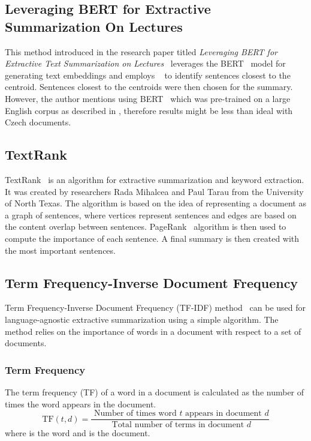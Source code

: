 \documentclass[english, ba, kiv, he, iso690numb, pdf, viewonly]{fasthesis}
\begin{document}
\subsection{Leveraging BERT for Extractive Summarization On Lectures} \label{bertlecturesummary}
This method introduced in the research paper titled \textit{Leveraging BERT for Extractive Text Summarization on
Lectures}~\cite{miller2019leveraging} leverages the BERT~\cite{devlin2019bert} model for generating text embeddings and employs ~\cite{Jin2010} to identify sentences closest to the centroid. Sentences closest to the centroids were then chosen for the summary. However, the author mentions using BERT~\cite{devlin2019bert} which was pre-trained on a large English corpus as described in \cite{devlin2019bert}, therefore results might be less than ideal with Czech documents.

\subsection{TextRank}\label{textrank}
TextRank~\cite{mihalcea-tarau-2004-textrank} is an algorithm for extractive summarization and keyword extraction. It was created by researchers Rada Mihalcea and Paul Tarau from the University of North Texas. The algorithm is based on the idea of representing a document as a graph of sentences, where vertices represent sentences and edges are based on the content overlap between sentences. PageRank~\cite{Page1999ThePC} algorithm is then used to compute the importance of each sentence. A final summary is then created with the most important sentences. 

\subsection{Term Frequency-Inverse Document Frequency}
Term Frequency-Inverse Document Frequency (TF-IDF) method~\cite{ChristianTFIDFSumm2016} can be used for language-agnostic extractive summarization using a simple algorithm. The method relies on the importance of words in a document with respect to a set of documents. 
\subsubsection{Term Frequency}
The term frequency (TF) of a word in a document is calculated as the number of times the word appears in the document. 
$$
\mathrm{TF}(t, d)=\frac{\text { Number of times word } t \text { appears in document } d}{\text { Total number of terms in document } d}
$$
where  is the word and  is the document.
\end{document}
